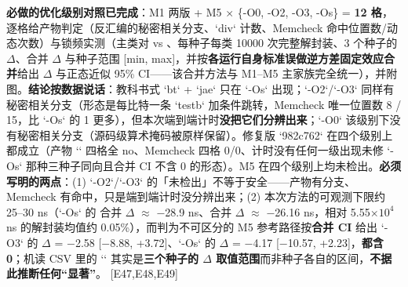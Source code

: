 \documentclass[UTF8,fontset=fandol,11pt,a4paper]{ctexart}
\begin{document}
\textbf{必做的优化级别对照已完成}：M1 两版 + M5 \texorpdfstring{$\times$}{x} \{-O0, -O2, -O3, -Os\} = \textbf{12 格}，逐格给产物判定（反汇编的秘密相关分支、`div` 计数、Memcheck 命中位置数/动态次数）与锁频实测（主类对 \texttt{} vs \texttt{}、每种子每类 10000 次完整解封装、3 个种子的 \texorpdfstring{$\Delta$}{Delta}、合并 \texorpdfstring{$\Delta$}{Delta} 与种子范围 [min, max]，并按\textbf{各运行自身标准误做逆方差固定效应合并}给出 \texorpdfstring{$\Delta$}{Delta}\texttt{} 与正态近似 95\% CI——该合并方法与 M1–M5 主家族完全统一），并附图。\textbf{结论按数据说话}：教科书式 `bt` + `jae` 只在 `-Os` 出现；`-O2`/`-O3` 同样有秘密相关分支（形态是每比特一条 `testb` 加条件跳转，Memcheck 唯一位置数 8 / 15，比 `-Os` 的 1 更多），但本次端到端计时\textbf{没把它们分辨出来}；`-O0` 该级别下没有秘密相关分支（源码级算术掩码被原样保留）。修复版 `982c762` 在四个级别上都成立（产物 `\texttt{}` 四格全 no、Memcheck 四格 0/0、计时没有任何一级出现未修 `-Os` 那种三种子同向且合并 CI 不含 0 的形态）。M5 在四个级别上均未检出。\textbf{必须写明的两点}：(1) `-O2`/`-O3` 的「未检出」不等于安全——产物有分支、Memcheck 有命中，只是端到端计时没分辨出来；(2) 本次方法的可观测下限约 25–30 ns（`-Os` 的 合并 \texorpdfstring{$\Delta$}{Delta} \texorpdfstring{$\approx$}{~=} \texorpdfstring{$-$}{-}28.9 ns、合并 \texorpdfstring{$\Delta$}{Delta}\texttt{} \texorpdfstring{$\approx$}{~=} \texorpdfstring{$-$}{-}26.16 ns，相对 5.55\texorpdfstring{$\times 10^{4}$}{x10^4} ns 的解封装均值约 0.05\%），而判为不可区分的 M5 参考路径按\textbf{合并 CI} 给出 `-O3` 的 \texorpdfstring{$\Delta$}{Delta}\texttt{} = \texorpdfstring{$-$}{-}2.58 [\texorpdfstring{$-$}{-}8.88, +3.72]、`-Os` 的 \texorpdfstring{$\Delta$}{Delta}\texttt{} = \texorpdfstring{$-$}{-}4.17 [\texorpdfstring{$-$}{-}10.57, +2.23]，\textbf{都含 0}；机读 CSV 里的 `\texttt{}` 其实是\textbf{三个种子的 \texorpdfstring{$\Delta$}{Delta} 取值范围}而非种子各自的区间，\textbf{不据此推断任何“显著”}。 [E47,E48,E49]
\end{document}

